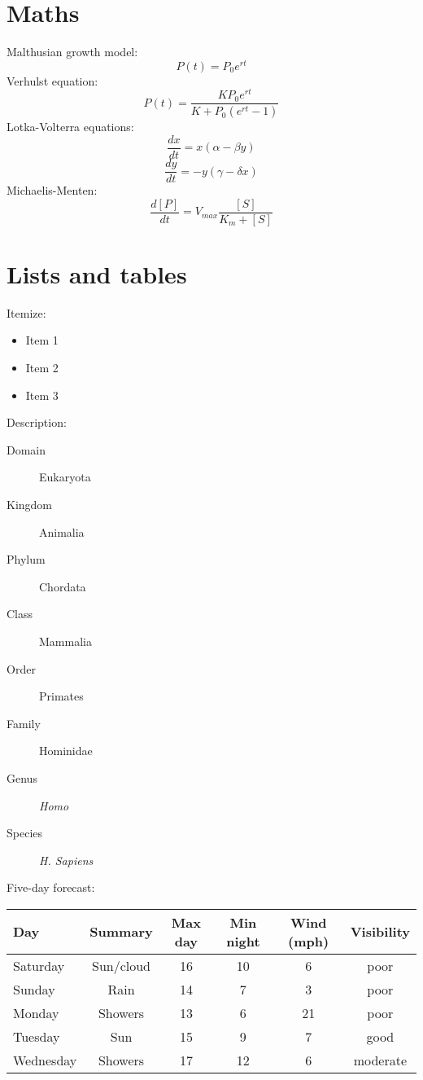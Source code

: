 \documentclass[a0,final]{a0poster}
\begin{document}
\begin{multicols}{3}
\section*{Maths}
Malthusian growth model:
$$P(t) = P_0 e^{rt}$$
Verhulst equation:
$$P(t) = \frac{K P_0 e^{rt}}{K + P_0 (e^{rt} - 1)}$$
Lotka-Volterra equations:
$$\frac{dx}{dt} = x(\alpha - \beta y)$$
$$\frac{dy}{dt} = - y(\gamma - \delta x)$$
Michaelis-Menten:
$$\frac{d[P]}{dt} = V_{max} \frac{[S]}{K_m + [S]}$$


\section*{Lists and tables}
Itemize:
\begin{itemize}
\item Item 1
\item Item 2
\item Item 3
\end{itemize}
\null
Description:
\begin{description}
\item[Domain] Eukaryota
\item[Kingdom] Animalia
\item[Phylum] Chordata
\item[Class] Mammalia
\item[Order] Primates
\item[Family] Hominidae
\item[Genus] \emph{Homo}
\item[Species] \emph{H. Sapiens}
\end{description}
\null
Five-day forecast:
\begin{center}
\begin{tabular}{lccccc}
Day & Summary & Max day & Min night & Wind (mph) & Visibility\\
\hline
Saturday & Sun/cloud & 16 & 10 & 6 & poor\\
Sunday & Rain & 14 & 7 & 3 & poor\\
Monday & Showers & 13 & 6 & 21 & poor\\
Tuesday & Sun & 15 & 9 & 7 & good\\
Wednesday & Showers & 17 & 12 & 6 &moderate
\end{tabular}
\end{center}


\columnbreak


\end{multicols}
\end{document}
